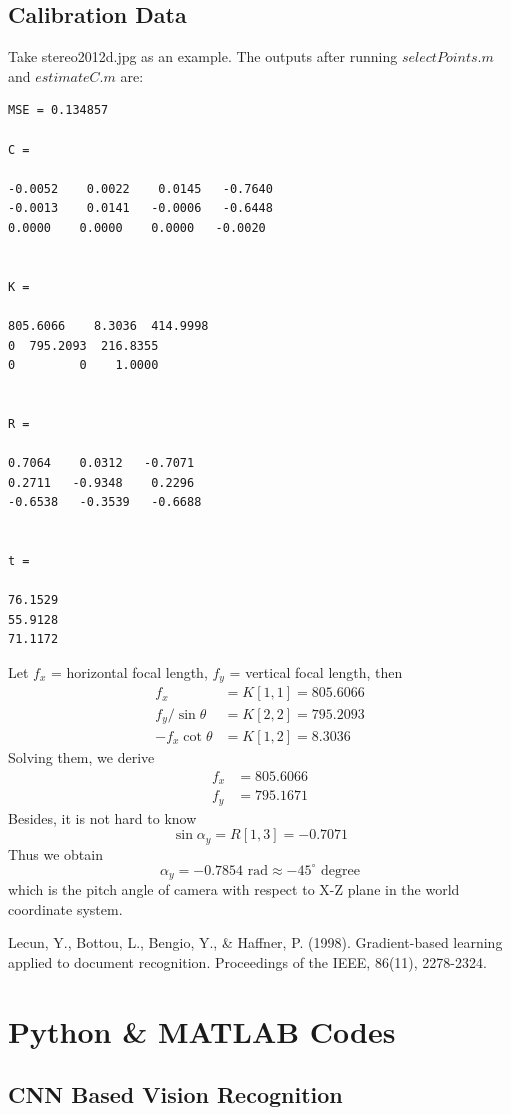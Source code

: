 \documentclass{article}
\begin{document}
\subsection{Calibration Data}
Take stereo2012d.jpg as an example. The outputs after running \hyperref[code-2.2]{$selectPoints.m$} and \hyperref[code-2.3]{$estimateC.m$} are:
\begin{verbatim}
MSE = 0.134857

C =

-0.0052    0.0022    0.0145   -0.7640
-0.0013    0.0141   -0.0006   -0.6448
0.0000    0.0000    0.0000   -0.0020


K =

805.6066    8.3036  414.9998
0  795.2093  216.8355
0         0    1.0000


R =

0.7064    0.0312   -0.7071
0.2711   -0.9348    0.2296
-0.6538   -0.3539   -0.6688


t =

76.1529
55.9128
71.1172
\end{verbatim}
Let $f_x$ = horizontal focal length, $f_y$ = vertical focal length, then
\begin{align*}
	f_x &= K[1,1] = 805.6066 \\
	f_y/\sin\theta &= K[2,2] = 795.2093 \\
	-f_x\cot\theta &= K[1,2] = 8.3036
\end{align*}
Solving them, we derive
\begin{align*}
	f_x &= 805.6066 \\
	f_y &= 795.1671
\end{align*}
Besides, it is not hard to know
\[
\sin \alpha_y = R[1,3] = -0.7071
\]
Thus we obtain
\[
\alpha_y = -0.7854 \text{ rad} \approx -45^\circ \text{ degree}
\]
which is the pitch angle of camera with respect to X-Z plane in the world coordinate system.


\begin{thebibliography}{1}
	 Lecun, Y., Bottou, L., Bengio, Y., \& Haffner, P. (1998). Gradient-based learning applied to document recognition. Proceedings of the IEEE, 86(11), 2278-2324.
\end{thebibliography}


\appendix
\section{Python \& MATLAB Codes}

\subsection{CNN Based Vision Recognition}
\end{document}
